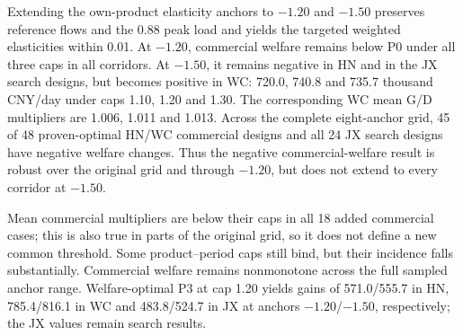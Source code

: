 Extending the own-product elasticity anchors to $-1.20$ and $-1.50$ preserves reference flows and the 0.88 peak load and yields the targeted weighted elasticities within 0.01. At $-1.20$, commercial welfare remains below P0 under all three caps in all corridors. At $-1.50$, it remains negative in HN and in the JX search designs, but becomes positive in WC: 720.0, 740.8 and 735.7 thousand CNY/day under caps 1.10, 1.20 and 1.30. The corresponding WC mean G/D multipliers are 1.006, 1.011 and 1.013. Across the complete eight-anchor grid, 45 of 48 proven-optimal HN/WC commercial designs and all 24 JX search designs have negative welfare changes. Thus the negative commercial-welfare result is robust over the original grid and through $-1.20$, but does not extend to every corridor at $-1.50$.

Mean commercial multipliers are below their caps in all 18 added commercial cases; this is also true in parts of the original grid, so it does not define a new common threshold. Some product--period caps still bind, but their incidence falls substantially. Commercial welfare remains nonmonotone across the full sampled anchor range. Welfare-optimal P3 at cap 1.20 yields gains of 571.0/555.7 in HN, 785.4/816.1 in WC and 483.8/524.7 in JX at anchors $-1.20$/$-1.50$, respectively; the JX values remain search results.
